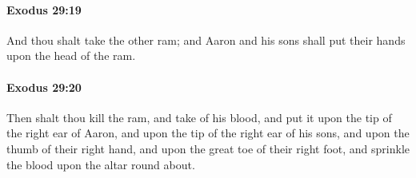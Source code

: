 		\paragraph{Exodus 29:19} %
			\label{EXODUS-29-19}

			And thou shalt take the other ram; and Aaron and his sons shall put their hands upon the head of the ram.


		\paragraph{Exodus 29:20} %
			\label{EXODUS-29-20}

			Then shalt thou kill the ram, and take of his blood, and put it upon the tip of the right ear of Aaron, and upon the tip of the right ear of his sons, and upon the thumb of their right hand, and upon the great toe of their right foot, and sprinkle the blood upon the altar round about.

